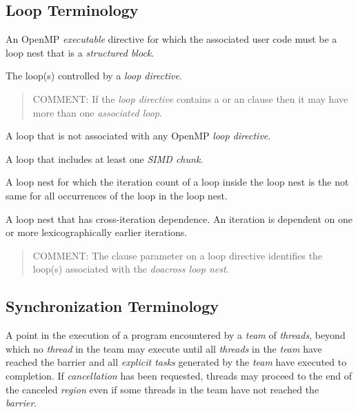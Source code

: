 %
%
% 
\subsection{Loop Terminology}
\label{subsec:Loop Terminology}
\glossarydefstart
An OpenMP \emph{executable} directive for which the associated user 
code must be a loop nest that is a \emph{structured block}.
\glossarydefend

\glossarydefstart
The loop(s) controlled by a \emph{loop directive}.
\begin{quote}
COMMENT: If the \emph{loop directive} contains a  or 
an \code{)} clause then it may have more than 
one \emph{associated loop}.
\end{quote}
\glossarydefend

\glossarydefstart
A loop that is not associated with any OpenMP \emph{loop directive}.
\glossarydefend

\glossarydefstart
A loop that includes at least one \emph{SIMD chunk}.
\glossarydefend

\glossarydefstart
A loop nest for which the iteration count of a loop inside the loop nest is the
not same for all occurrences of the loop in the loop nest.
\glossarydefend

\glossarydefstart
A loop nest that has cross-iteration dependence. An iteration is dependent 
on one or more lexicographically earlier iterations.
\begin{quote}
COMMENT: The  clause parameter on a loop directive identifies 
the loop(s) associated with the \emph{doacross loop nest}.
\end{quote}
\glossarydefend

%
%
\subsection{Synchronization Terminology}
\label{subsec:Synchronization Terminology}
\glossarydefstart
A point in the execution of a program encountered by a \emph{team} 
of \emph{threads}, beyond which no \emph{thread} in the team may 
execute until all \emph{threads} in the \emph{team} have reached 
the barrier and all \emph{explicit tasks} generated by the \emph{team} 
have executed to completion. If \emph{cancellation} has been requested, 
threads may proceed to the end of the canceled \emph{region} even if 
some threads in the team have not reached the \emph{barrier}.
\glossarydefend

